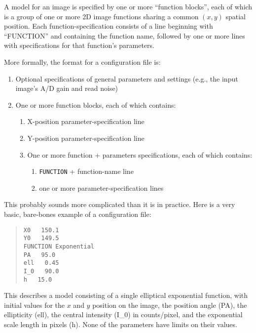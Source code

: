 \documentclass[10pt]{article}
\begin{document}
A model for an image is specified by one or more ``function blocks'', each of
which is a group of one or more 2D image functions sharing a common $(x,y)$
spatial position. Each function-specification consists of a line beginning with
``FUNCTION'' and containing the function name, followed by one or more lines
with specifications for that function's parameters.

\bigskip

More formally, the format for a configuration file is:
\begin{enumerate}
\item Optional specifications of general parameters and settings (e.g., the
input image's A/D gain and read noise)
\item One or more function blocks, each of which contains:
\begin{enumerate}
\item X-position parameter-specification line
\item Y-position parameter-specification line
\item One or more function + parameters specifications, each of which contains:
\begin{enumerate}
\item \texttt{FUNCTION} + function-name line
\item one or more parameter-specification lines
\end{enumerate}
\end{enumerate}
\end{enumerate}

This probably sounds more complicated than it is in practice.
Here is a very basic, bare-bones example of a configuration file:

\begin{quote}
  \texttt{X0  ~  150.1}\\
  \texttt{Y0  ~  149.5}\\
  \texttt{FUNCTION   Exponential}\\
  \texttt{PA  ~  95.0}\\
  \texttt{ell  ~  0.45}\\
  \texttt{I\_0 ~  90.0}\\
  \texttt{h   ~  15.0}\\
\end{quote}

This describes a model consisting of a single elliptical exponential
function, with initial values for the $x$ and $y$ position on the image,
the position angle (PA), the ellipticity (ell), the central intensity
(I\_0) in counts/pixel, and the exponential scale length in pixels (h).
None of the parameters have limits on their values.
\end{document}
